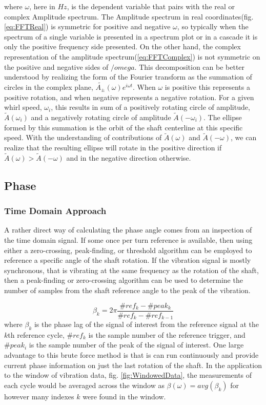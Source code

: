 where $ \omega $, here in $ Hz $, is the dependent variable that pairs with the real or complex Amplitude spectrum. The Amplitude spectrum in real coordinates(fig.\eqref{eq:FFTReal}) is symmetric for positive and negative $ \omega $, so typically when the spectrum of a single variable is presented in a spectrum plot or in a cascade it is only the positive frequency side presented. On the other hand, the complex representation of the amplitude spectrum(\eqref{eq:FFTComplex}) is not symmetric on the positive and negative sides of $ /omega $. This decomposition can be better understood by realizing the form of the Fourier transform as the summation of circles in the complex plane, $ \tilde{A_\pm}(\omega)e^{i\omega t} $. When $ \omega $ is positive this represents a positive rotation, and when negative represents a negative rotation. For a given whirl speed, $ \omega_i $, this results in sum of a positively rotating circle of amplitude, $ \tilde{A}(\omega_i) $ and a negatively rotating circle of amplitude $ \tilde{A}(-\omega_i) $. The ellipse formed by this summation is the orbit of the shaft centerline at this specific speed. With the understanding of contributions of $ \tilde{A}(\omega) $ and $ \tilde{A}(-\omega) $, we can realize that the resulting ellipse will rotate in the positive direction if $ \tilde{A}(\omega)> \tilde{A}(-\omega) $ and in the negative direction otherwise.
\subsection{Phase}
\subsubsection{Time Domain Approach}
A rather direct way of calculating the phase angle comes from an inspection of the time domain signal. If some once per turn reference is available, then using either a zero-crossing, peak-finding, or threshold algorithm can be employed to reference a specific angle of the shaft rotation. If the vibration signal is mostly synchronous, that is vibrating at the same frequency as the rotation of the shaft, then a peak-finding or zero-crossing algorithm can be used to determine the number of samples from the shaft reference angle to the peak of the vibration.\par 
\begin{equation}\label{eq:PhaseAngleTimeDomain}
\beta_k = 2\pi\frac{\#ref_k-\#peak_k}{\#ref_k-\#ref_{k-1}}
\end{equation}
where $ \beta_k $ is the phase lag of the signal of interest from the reference signal at the $ k $th reference cycle, $ \#ref_k $ is the sample number of the reference trigger, and $ \#peak_i $ is the sample number of the peak of the signal of interest. One large advantage to this brute force method is that is can run continuously and provide current phase information on just the last rotation of the shaft. In the application to the window of vibration data, fig. \ref{fig:WindowedData}, the measurements of each cycle would be averaged across the window as $ \beta(\omega)=avg(\beta_k) $ for however many indexes $ k $ were found in the window. \par 
